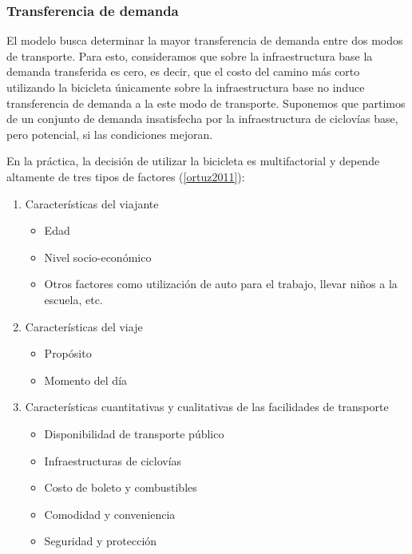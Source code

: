 \documentclass{article}
\begin{document}
  \subsubsection*{Transferencia de demanda}

  El modelo busca determinar la mayor transferencia de demanda entre dos modos de transporte. Para esto, consideramos que sobre la infraestructura base la demanda transferida es cero, es decir, que el costo del camino más corto utilizando la bicicleta únicamente sobre la infraestructura base no induce transferencia de demanda a la este modo de transporte. Suponemos que partimos de un conjunto de demanda insatisfecha por la infraestructura de ciclovías base, pero potencial, si las condiciones mejoran.

  En la práctica, la decisión de utilizar la bicicleta es multifactorial y depende altamente de tres tipos de factores (\ref{ortuz2011}):

  \begin{enumerate}
    \item{
        Características del viajante
          \begin{itemize}
            \item{Edad}
            \item{Nivel socio-económico}
            \item{Otros factores como utilización de auto para el trabajo, llevar niños a la escuela, etc.}
          \end{itemize}
    }
    \item{
        Características del viaje
          \begin{itemize}
            \item{Propósito}
            \item{Momento del día}
          \end{itemize}
    }
    \item{
        Características cuantitativas y cualitativas de las facilidades de transporte
        \begin{itemize}
            \item{Disponibilidad de transporte público}
            \item{Infraestructuras de ciclovías}
            \item{Costo de boleto y combustibles}
            \item{Comodidad y conveniencia}
            \item{Seguridad y protección}
        \end{itemize}
    }
  \end{enumerate}
\end{document}
